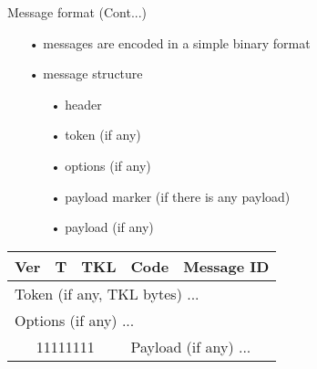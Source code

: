\documentclass[11pt]{beamer}
\begin{document}
\begin{frame}{Message format (Cont...)}
\begin{itemize}
\item[•] messages are encoded in a simple binary format
\item[•] message structure
\begin{itemize}
\item[•] header
\item[•] token (if any)
\item[•] options (if any)
\item[•] payload marker (if there is any payload)
\item[•] payload (if any)
\end{itemize}
\end{itemize}
\begin{center}
  \begin{tabular}{*{32}{c}}
    \hline
    \multicolumn{2}{|c|}{{\scriptsize Ver}} & \multicolumn{2}{|c|}{\scriptsize T} & \multicolumn{4}{|c|}{\scriptsize TKL} & \multicolumn{8}{|c|}{\scriptsize Code} & \multicolumn{16}{|c|}{\scriptsize Message ID} \\ \hline
    \multicolumn{32}{|l}{\scriptsize Token (if any, TKL bytes) ...} \\ \hline
    \multicolumn{32}{|l}{\scriptsize Options (if any) ...} \\ \hline
    \multicolumn{8}{|c|}{\scriptsize 11111111} & \multicolumn{24}{|l}{\scriptsize Payload (if any) ...} \\ \hline 
  \end{tabular}
\end{center}
\end{frame}
\end{document}

